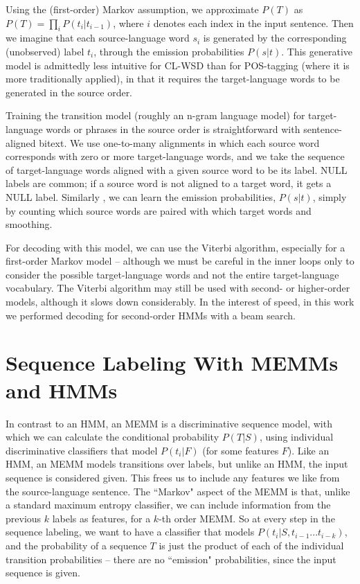 \documentclass[11pt]{article}
\begin{document}
Using the (first-order) Markov assumption, we approximate $P(T)$ as $P(T) =
\prod_{i} P(t_i | t_{i-1})$, where $i$ denotes each index in the input
sentence. Then we imagine that each source-language word $s_i$ is generated by
the corresponding (unobserved) label $t_i$, through the emission probabilities
$P(s|t)$. This generative model is admittedly less intuitive for CL-WSD than
for POS-tagging (where it is more traditionally applied), in that it requires
the target-language words to be generated in the source order.

Training the transition model (roughly an n-gram language model) for
target-language words or phrases in the source order is straightforward with
sentence-aligned bitext. We use one-to-many alignments in which each source
word corresponds with zero or more target-language words, and we take the
sequence of target-language words aligned with a given source word to be its
label. NULL labels are common; if a source word is not aligned to a target
word, it gets a NULL label. Similarly , we can learn the emission
probabilities, $P(s|t)$, simply by counting which source words are paired with
which target words and smoothing.

For decoding with this model, we can use the Viterbi algorithm, especially for
a first-order Markov model -- although we must be careful in the inner loops
only to consider the possible target-language words and not the entire
target-language vocabulary. The Viterbi algorithm may still be used with
second- or higher-order models, although it slows down considerably. In the
interest of speed, in this work we performed decoding for second-order HMMs
with a beam search.

\section{Sequence Labeling With MEMMs and HMMs}
In contrast to an HMM, an MEMM is a discriminative sequence model, with
which we can calculate the conditional probability $P(T|S)$, using individual
discriminative classifiers that model $P(t_i | F)$ (for some features $F$).
Like an HMM, an MEMM models transitions over labels, but unlike an HMM, the
input sequence is considered given. This frees us to include any features we
like from the source-language sentence. The ``Markov" aspect of the MEMM is
that, unlike a standard maximum entropy classifier, we can include information
from the previous $k$ labels as features, for a $k$-th order MEMM. So at every
step in the sequence labeling, we want to have a classifier that models 
$P(t_i | S, t_{i-1}...t_{i-k})$, and the probability of a sequence $T$ is just
the product of each of the individual transition probabilities -- there are no
``emission" probabilities, since the input sequence is given.
\end{document}
